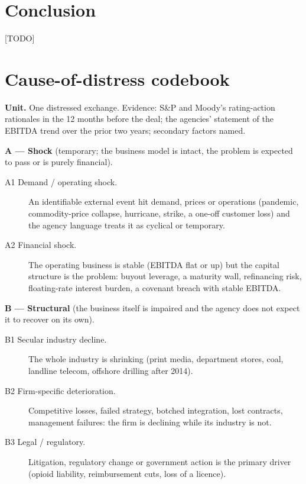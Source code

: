 \documentclass[12pt]{article}
\begin{document}
\section{Conclusion}
[TODO]



\appendix
\section{Cause-of-distress codebook}
\label{app:codebook}

\noindent\textbf{Unit.} One distressed exchange. Evidence: S\&P and Moody's rating-action rationales in the 12 months before the deal; the agencies' statement of the EBITDA trend over the prior two years; secondary factors named.

\medskip\noindent\textbf{A --- Shock} (temporary; the business model is intact, the problem is expected to pass or is purely financial).
\begin{description}
  \item[A1 Demand / operating shock.] An identifiable external event hit demand, prices or operations (pandemic, commodity-price collapse, hurricane, strike, a one-off customer loss) and the agency language treats it as cyclical or temporary.
  \item[A2 Financial shock.] The operating business is stable (EBITDA flat or up) but the capital structure is the problem: buyout leverage, a maturity wall, refinancing risk, floating-rate interest burden, a covenant breach with stable EBITDA.
\end{description}

\noindent\textbf{B --- Structural} (the business itself is impaired and the agency does not expect it to recover on its own).
\begin{description}
  \item[B1 Secular industry decline.] The whole industry is shrinking (print media, department stores, coal, landline telecom, offshore drilling after 2014).
  \item[B2 Firm-specific deterioration.] Competitive losses, failed strategy, botched integration, lost contracts, management failures: the firm is declining while its industry is not.
  \item[B3 Legal / regulatory.] Litigation, regulatory change or government action is the primary driver (opioid liability, reimbursement cuts, loss of a licence).
\end{description}
\end{document}
